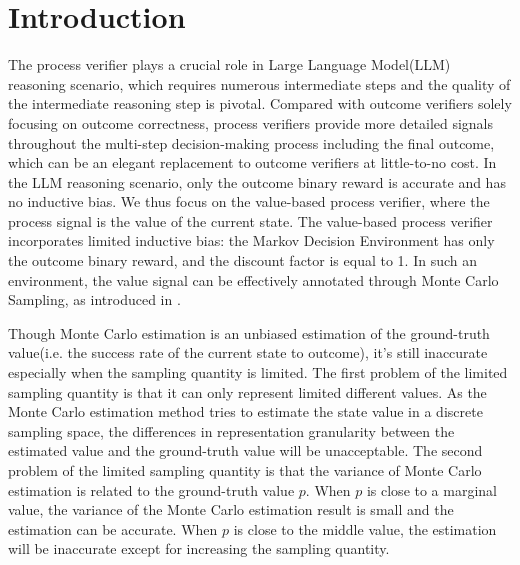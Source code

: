 \section{Introduction}
The process verifier plays a crucial role in Large Language Model(LLM) reasoning scenario, which requires numerous intermediate steps and the quality of the intermediate reasoning step is pivotal\citep{DBLP:conf/iclr/LightmanKBEBLLS24}. Compared with outcome verifiers solely focusing on outcome correctness\citep{DBLP:journals/corr/abs-2110-14168}, process verifiers provide more detailed signals throughout the multi-step decision-making process including the final outcome, which can be an elegant replacement to outcome verifiers at little-to-no cost\citep{DBLP:conf/iclr/LightmanKBEBLLS24}. In the LLM reasoning scenario, only the outcome binary reward is accurate and has no inductive bias. We thus focus on the value-based process verifier, where the process signal is the value of the current state\citep{lu2024autopsv, DBLP:journals/corr/abs-2406-06592,DBLP:journals/corr/abs-2408-03314}. The value-based process verifier incorporates limited inductive bias: the Markov Decision Environment has only the outcome binary reward, and the discount factor is equal to 1. In such an environment, the value signal can be effectively annotated through Monte Carlo Sampling, as introduced in \citet{DBLP:conf/acl/WangLSXDLCWS24}.

Though Monte Carlo estimation is an unbiased estimation of the ground-truth value(i.e. the success rate of the current state to outcome), it's still inaccurate especially when the sampling quantity is limited. The first problem of the limited sampling quantity is that it can only represent limited different values. As the Monte Carlo estimation method tries to estimate the state value in a discrete sampling space, the differences in representation granularity between the estimated value and the ground-truth value will be unacceptable. The second problem of the limited sampling quantity is that the variance of Monte Carlo estimation is related to the ground-truth value $p$. When $p$ is close to a marginal value, the variance of the Monte Carlo estimation result is small and the estimation can be accurate. When $p$ is close to the middle value, the estimation will be inaccurate except for increasing the sampling quantity.

